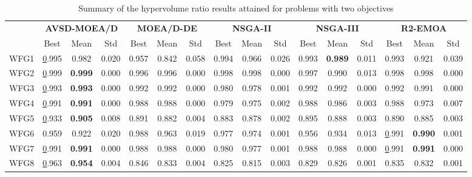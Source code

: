 \begin{table*}[t]
\caption{Summary of the hypervolume ratio results attained for problems with two objectives}
\label{tab:StatisticsHV_2obj}
\centering
\begin{scriptsize}
\begin{tabular}{c c|c|c|c|c|c|c|c|c|c|c|c|c|c|c}
\cline{2-16}
 & \multicolumn{3}{c|}{\textbf{AVSD-MOEA/D}} & \multicolumn{3}{c|}{\textbf{MOEA/D-DE}} & \multicolumn{3}{c|}{\textbf{NSGA-II}} & \multicolumn{3}{c|}{\textbf{NSGA-III}} & \multicolumn{3}{c}{\textbf{R2-EMOA}} \\ \cline{2-16} 
 & Best & Mean & Std & Best & Mean & Std & Best & Mean & Std & Best & Mean & Std & Best & Mean & Std \\ \hline
\multicolumn{1}{c|}{WFG1} & {\ul 0.995} & 0.982 & 0.020 & 0.957 & 0.842 & 0.058 & 0.994 & 0.966 & 0.026 & 0.993 & \textbf{0.989} & 0.011 & 0.993 & 0.921 & 0.039 \\ \hline
\multicolumn{1}{c|}{WFG2} & {\ul 0.999} & \textbf{0.999} & 0.000 & 0.996 & 0.996 & 0.000 & 0.998 & 0.998 & 0.000 & 0.997 & 0.990 & 0.013 & 0.998 & 0.998 & 0.000 \\ \hline
\multicolumn{1}{c|}{WFG3} & {\ul 0.993} & \textbf{0.993} & 0.000 & 0.992 & 0.992 & 0.000 & 0.980 & 0.978 & 0.001 & 0.992 & 0.992 & 0.000 & 0.992 & 0.991 & 0.000 \\ \hline
\multicolumn{1}{c|}{WFG4} & {\ul 0.991} & \textbf{0.991} & 0.000 & 0.988 & 0.988 & 0.000 & 0.979 & 0.975 & 0.002 & 0.988 & 0.986 & 0.003 & 0.988 & 0.973 & 0.007 \\ \hline
\multicolumn{1}{c|}{WFG5} & {\ul 0.933} & \textbf{0.905} & 0.008 & 0.891 & 0.882 & 0.004 & 0.883 & 0.878 & 0.002 & 0.895 & 0.888 & 0.003 & 0.890 & 0.885 & 0.003 \\ \hline
\multicolumn{1}{c|}{WFG6} & 0.959 & 0.922 & 0.020 & 0.988 & 0.963 & 0.019 & 0.977 & 0.974 & 0.001 & 0.956 & 0.934 & 0.013 & {\ul 0.991} & \textbf{0.990} & 0.001 \\ \hline
\multicolumn{1}{c|}{WFG7} & {\ul 0.991} & \textbf{0.991} & 0.000 & 0.988 & 0.988 & 0.000 & 0.980 & 0.977 & 0.001 & 0.988 & 0.988 & 0.000 & {\ul 0.991} & \textbf{0.991} & 0.000 \\ \hline
\multicolumn{1}{c|}{WFG8} & {\ul 0.963} & \textbf{0.954} & 0.004 & 0.846 & 0.833 & 0.004 & 0.825 & 0.815 & 0.003 & 0.829 & 0.826 & 0.001 & 0.835 & 0.832 & 0.001 \\ \hline

\end{tabular}
\end{scriptsize}
\end{table*}
